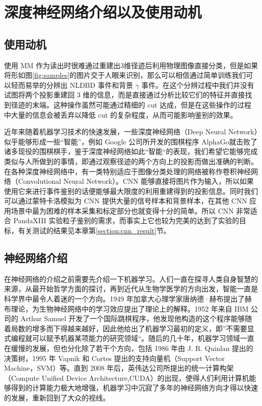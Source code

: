 \section{深度神经网络介绍以及使用动机}

\subsection{使用动机}

使用 MM 作为读出时很难通过重建出3维径迹后利用物理图像直接分类，但是如果将形如图\ref{fig:samples}的图片交于人眼来识别，那么可以相信通过简单训练我们可以轻而易举的分辨出 NLDBD 事件和背景 $\gamma$ 事件。在这个分辨过程中我们并没有试图将两个投影重建回 3 维的信息，而是直接通过分析比较它们的特征并直接找到径迹的末端。这种操作虽然可能通过精细的 cut 达成，但是在这些操作的过程中大量的信息会被丢弃以降低 cut 的复杂程度，从而可能影响鉴别的效果。

近年来随着机器学习技术的快速发展，一些深度神经网络（Deep Neural Network）似乎能够形成一些“智能”，例如 Google 公司所开发的围棋程序 AlphaGo\supercite{gibney2016google}就击败了诸多现役的围棋棋手，鉴于深度神经网络如此“智能“的表现，我们希望它能够完成类似与人所做到的事情，即通过观察径迹的两个方向上的投影而做出准确的判断。在各种深度神经网络中，有一类特别适应于图像分类处理的网络被称作卷积神经网络（Convolutional Neural Network）。CNN 能够直接将图片作为输入，所以如果使用它来进行事件鉴别的话便能够最大限度的利用重建得到的投影信息。同时我们可以通过蒙特卡洛模拟为 CNN 提供大量的信号样本和背景样本，在其他 CNN 应用场景中最为困难的样本采集和标定部分也就变得十分的简单。所以 CNN 非常适合 PandaXIII 实验粒子鉴别的需求，而事实上它也较为完美的达到了实验的目标，有关测试的结果见本章第\ref{section:cnn_result}节。

\subsection{神经网络介绍}

在神经网络的介绍之前需要先介绍一下机器学习。人们一直在探寻人类自身智慧的来源，从最开始哲学方面的探讨，再到近代从生物学医学的方向出发，智能一直是科学界中最令人着迷的一个方向。1949 年加拿大心理学家唐纳德·赫布提出了赫布理论\supercite{hebbian}，为生物神经网络中的学习效应提出了理论上的解释。1952 年来自 IBM 公司的 Arthur Samuel 开发了一个国际跳棋程序，他发现他构造的这个程序能够随着局数的增多而下得越来越好，因此他给出了机器学习最初的定义，即”不需要显式编程就可以赋予机器某项能力的研究领域“。随后的几十年，机器学习领域一直在缓慢的发展，但也分化除了若干个方向，包括 1986 年由 J. R. Quinlan 提出的决策树，1995 年 Vapnik 和 Cortes 提出的支持向量机（Support Vector Machine，SVM）等\supercite{mlhistory}。直到 2008 年后，英伟达公司所提出的统一计算构架（Compute Unified Device Architecture,CUDA）\supercite{CUDA}的出现，使得人们利用计算机能够得到的计算能力极大地增强，机器学习中沉寂了多年的神经网络方向才得以快速的发展，重新回到了大众的视线。

